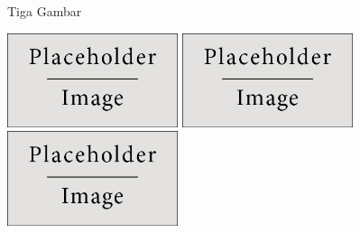 \documentclass{beamer}
\begin{document}
\begin{frame}[t]{Tiga Gambar}

\hfil\hfil\includegraphics[width=5cm]{figures/placeholder}\newline
  \null\hfil\hfil{}\newline
  \vfil
  \hfil\hfil{\includegraphics[width=5cm]{figures/placeholder}}\hfil\hfil
    {\includegraphics[width=5cm]{figures/placeholder}}\newline
  \null\hfil\hfil{}
    \hfil\hfil{}

\end{frame}
\end{document}
